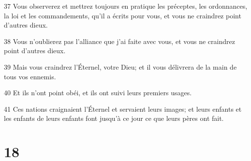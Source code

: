 \par 37 Vous observerez et mettrez toujours en pratique les préceptes, les ordonnances, la loi et les commandements, qu'il a écrits pour vous, et vous ne craindrez point d'autres dieux.
\par 38 Vous n'oublierez pas l'alliance que j'ai faite avec vous, et vous ne craindrez point d'autres dieux.
\par 39 Mais vous craindrez l'Éternel, votre Dieu; et il vous délivrera de la main de tous vos ennemis.
\par 40 Et ils n'ont point obéi, et ils ont suivi leurs premiers usages.
\par 41 Ces nations craignaient l'Éternel et servaient leurs images; et leurs enfants et les enfants de leurs enfants font jusqu'à ce jour ce que leurs pères ont fait.

\chapter{18}

